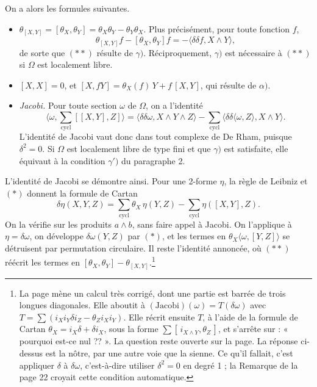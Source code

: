 \documentclass[11pt,a4paper]{article}
\begin{document}
On a alors les formules suivantes.
\begin{itemize}
  \item[(**)] $\theta_{[X,Y]} = [\theta_X, \theta_Y] = \theta_X\theta_Y -
  \theta_Y\theta_X$. Plus précisément, pour toute fonction $f$,
  \[
  \theta_{[X,Y]}f - [\theta_X, \theta_Y]f = -\langle \delta\delta f, X \wedge Y\rangle ,
  \]
  de sorte que $(**)$ résulte de $\gamma)$. Réciproquement, $\gamma)$ est
  nécessaire à $(**)$ si $\Omega$ est localement libre.
  \item $[X,X] = 0$, et $[X, fY] = \theta_X(f)\,Y + f\,[X,Y]$, qui résulte de
  $\alpha)$.
  \item \emph{Jacobi.} Pour toute section $\omega$ de $\Omega$, on a l'identité
  \[
  \Big\langle \omega, \sum_{\mathrm{cycl}} [[X,Y],Z] \Big\rangle
  = \langle \delta\delta\omega, X \wedge Y \wedge Z \rangle
  - \sum_{\mathrm{cycl}} \langle \delta\delta\langle\omega, Z\rangle, X \wedge Y \rangle .
  \]
  L'identité de Jacobi vaut donc dans tout complexe de De Rham, puisque
  $\delta^{2} = 0$. Si $\Omega$ est localement libre de type fini et que
  $\gamma)$ est satisfaite, elle équivaut à la condition $\gamma')$ du
  paragraphe 2.
\end{itemize}
L'identité de Jacobi se démontre ainsi. Pour une 2-forme $\eta$, la règle de
Leibniz et $(*)$ donnent la formule de Cartan
\[
\delta\eta(X,Y,Z) = \sum_{\mathrm{cycl}} \theta_X\,\eta(Y,Z)
- \sum_{\mathrm{cycl}} \eta([X,Y],Z).
\]
On la vérifie sur les produits $a \wedge b$, sans faire appel à Jacobi. On
l'applique à $\eta = \delta\omega$, on développe $\delta\omega(Y,Z)$ par $(*)$,
et les termes en $\theta_X\langle\omega, [Y,Z]\rangle$ se détruisent par
permutation circulaire. Il reste l'identité annoncée, où $(**)$ réécrit les
termes en $[\theta_X, \theta_Y] - \theta_{[X,Y]}$.\footnote{La page mène un
calcul très corrigé, dont une partie est barrée de trois longues diagonales.
Elle aboutit à $(\mathrm{Jacobi})(\omega) = T(\delta\omega)$ avec $T =
\sum(i_X i_Y \delta i_Z - \theta_Z i_X i_Y)$. Elle récrit ensuite $T$, à l'aide
de la formule de Cartan $\theta_X = i_X\delta + \delta i_X$, sous la forme
$\sum [\,i_{X \wedge Y}, \theta_Z\,]$, et s'arrête sur : « pourquoi est-ce nul
?? ». La question reste ouverte sur la page. La réponse ci-dessus est la nôtre,
par une autre voie que la sienne. Ce qu'il fallait, c'est appliquer $\delta$ à
$\delta\omega$, c'est-à-dire utiliser $\delta^{2} = 0$ en degré 1 ; la Remarque
de la page 22 croyait cette condition automatique.}
\end{document}
